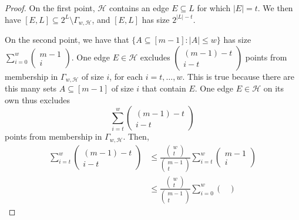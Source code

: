 \documentclass[10pt,a4paper]{amsart}
\begin{document}
\begin{proof}
    On the first point, $\mathcal{H}$ contains an edge $E \subseteq L$ for which $|E| = t$. We then have $[E,L] \subseteq 2^L \setminus \Gamma_{w,\mathcal{H}}$, and $[E,L]$ has size $2^{|L|-t}$.

    On the second point, we have that $\{A \subseteq [m-1]: |A| \leq w\}$ has size $\sum_{i=0}^w\left(\begin{smallmatrix}m-1\\i\end{smallmatrix}\right)$. One edge $E \in \mathcal{H}$ excludes $\left(\begin{smallmatrix}(m-1)-t\\i-t\end{smallmatrix}\right)$ points from membership in $\Gamma_{w,\mathcal{H}}$ of size $i$, for each $i = t, \ldots, w$. This is true because there are this many sets $A\subseteq [m-1]$ of size $i$ that contain $E$. One edge $E \in \mathcal{H}$ on its own thus excludes
    \begin{equation}
        \sum_{i=t}^w\begin{pmatrix}
            (m-1)-t\\i-t
        \end{pmatrix}
    \end{equation}
    points from membership in $\Gamma_{w,\mathcal{H}}$. Then,
    \begin{align}
        \sum_{i=t}^w\begin{pmatrix}
            (m-1)-t\\i-t
        \end{pmatrix}&\leq\frac{\begin{pmatrix}
            w\\t
        \end{pmatrix}}{\begin{pmatrix}
            m-1\\t
        \end{pmatrix}}\sum_{i=t}^w\begin{pmatrix}
            m-1\\i
        \end{pmatrix}\\
        &\leq \frac{\begin{pmatrix}
            w\\t
        \end{pmatrix}}{\begin{pmatrix}
            m-1\\t
        \end{pmatrix}}\sum_{i=0}^w\begin{pmatrix}

\end{pmatrix}
\end{align}
\end{proof}
\end{document}
